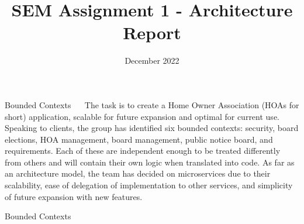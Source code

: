 \documentclass{article}
\title{SEM Assignment 1 - Architecture Report}
\date{December 2022}
\begin{document}
\maketitle
\begin{section}{Bounded Contexts}
$\quad$ The task is to create a Home Owner Association (HOAs for short) application, scalable for future expansion and optimal for current use. Speaking to clients, the group has identified six bounded contexts: security, board elections, HOA management, board management, public notice board, and requirements. Each of these are independent enough to be treated differently from others and will contain their own logic when translated into code. As far as an architecture model, the team has decided on microservices due to their scalability, ease of delegation of implementation to other services, and simplicity of future expansion with new features.
\end{section}{Bounded Contexts}
\end{document}
